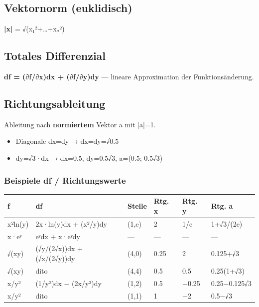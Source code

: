 \documentclass[11pt, a4paper]{article}
\begin{document}
\subsection{Vektornorm (euklidisch)}
\textbf{|x|} = √(x₁²+…+xₙ²)



\subsection{Totales Differenzial}
\textbf{df = (∂f/∂x)dx + (∂f/∂y)dy} — lineare Approximation der Funktionsänderung.



\subsection{Richtungsableitung}
Ableitung nach \textbf{normiertem} Vektor a mit |a|=1.

\begin{itemize}
  \item Diagonale dx=dy → dx=dy=√0.5
  \item dy=√3·dx → dx=0.5, dy=0.5√3, a=(0.5; 0.5√3)
\end{itemize}


\subsubsection{Beispiele df / Richtungswerte}

{\small
\begin{tabularx}{\linewidth}{XXXXXX}
\hline
\rowcolor{tableheadbg}
{\color{white}\textbf{f}} & {\color{white}\textbf{df}} & {\color{white}\textbf{Stelle}} & {\color{white}\textbf{Rtg. x}} & {\color{white}\textbf{Rtg. y}} & {\color{white}\textbf{Rtg. a}} \\[2pt]
\hline
\endhead
\hline
\endfoot
x²ln(y) & 2x·ln(y)dx + (x²/y)dy & (1,e) & 2 & 1/e & 1+√3/(2e) \\
x·eʸ & eʸdx + x·eʸdy & — & — & — & — \\
√(xy) & (√y/(2√x))dx + (√x/(2√y))dy & (4,0) & 0.25 & 2 & 0.125+√3 \\
√(xy) & dito & (4,4) & 0.5 & 0.5 & 0.25(1+√3) \\
x/y² & (1/y²)dx − (2x/y³)dy & (1,2) & 0.5 & −0.25 & 0.25−0.125√3 \\
x/y² & dito & (1,1) & 1 & −2 & 0.5−√3 \\
\end{tabularx}
}
\end{document}
